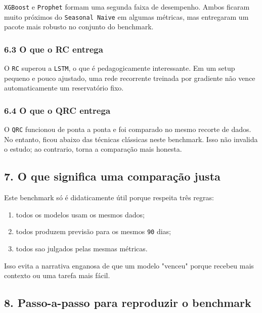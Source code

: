 \documentclass[12pt]{article}
\providecommand{\tightlist}{%
  \setlength{\itemsep}{0pt}\setlength{\parskip}{0pt}}
\begin{document}
\texttt{XGBoost} e \texttt{Prophet} formam uma segunda faixa de desempenho. Ambos ficaram muito próximos do \texttt{Seasonal\ Naive} em algumas métricas, mas entregaram um pacote mais robusto no conjunto do benchmark.

\subsubsection{6.3 O que o RC entrega}\label{63-o-que-o-rc-entrega}

O \texttt{RC} superou a \texttt{LSTM}, o que é pedagogicamente interessante. Em um setup pequeno e pouco ajustado, uma rede recorrente treinada por gradiente não vence automaticamente um reservatório fixo.

\subsubsection{6.4 O que o QRC entrega}\label{64-o-que-o-qrc-entrega}

O \texttt{QRC} funcionou de ponta a ponta e foi comparado no mesmo recorte de dados. No entanto, ficou abaixo das técnicas clássicas neste benchmark. Isso não invalida o estudo; ao contrario, torna a comparação mais honesta.

\subsection{7. O que significa uma comparação justa}\label{7-o-que-significa-uma-comparauxe7uxe3o-justa}

Este benchmark só é didaticamente útil porque respeita três regras:

\begin{enumerate}
\def\labelenumi{\arabic{enumi}.}
\tightlist
\item
  todos os modelos usam os mesmos dados;
\item
  todos produzem previsão para os mesmos \texttt{90} dias;
\item
  todos sao julgados pelas mesmas métricas.
\end{enumerate}

Isso evita a narrativa enganosa de que um modelo "venceu" porque recebeu mais contexto ou uma tarefa mais fácil.

\subsection{8. Passo-a-passo para reproduzir o benchmark}\label{8-passo-a-passo-para-reproduzir-o-benchmark}
\end{document}
